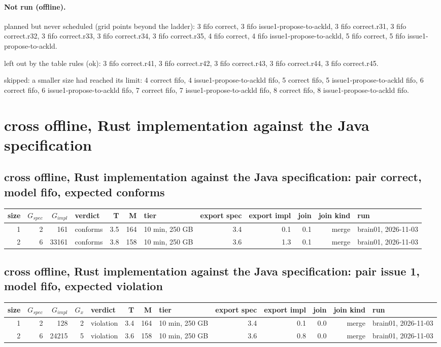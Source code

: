 \documentclass[10pt]{article}
\begin{document}
\paragraph{Not run (offline).}
planned but never scheduled (grid points beyond the ladder): 3 fifo correct, 3 fifo issue1-propose-to-ackld, 3 fifo correct.r31, 3 fifo correct.r32, 3 fifo correct.r33, 3 fifo correct.r34, 3 fifo correct.r35, 4 fifo correct, 4 fifo issue1-propose-to-ackld, 5 fifo correct, 5 fifo issue1-propose-to-ackld.\par
left out by the table rules (ok): 3 fifo correct.r41, 3 fifo correct.r42, 3 fifo correct.r43, 3 fifo correct.r44, 3 fifo correct.r45.\par
skipped: a smaller size had reached its limit: 4 correct fifo, 4 issue1-propose-to-ackld fifo, 5 correct fifo, 5 issue1-propose-to-ackld fifo, 6 correct fifo, 6 issue1-propose-to-ackld fifo, 7 correct fifo, 7 issue1-propose-to-ackld fifo, 8 correct fifo, 8 issue1-propose-to-ackld fifo.\par
\section*{cross offline, Rust implementation against the Java specification}
\subsection*{cross offline, Rust implementation against the Java specification: pair \textsf{correct}, model fifo, expected conforms}
\begin{longtable}{@{}rrrlrrlrrrrl@{}}
\toprule
size & $G_{\mathit{spec}}$ & $G_{\mathit{impl}}$ & verdict & T & M & tier & export spec & export impl & join & join kind & run \\
\midrule
\endhead
\color{blue} 1 & 2 & 161 & conforms & 3.5 & 164 & 10 min, 250 GB & 3.4 & 0.1 & 0.1 & merge & brain01, 2026-11-03 \\
\color{blue} 2 & 6 & 33161 & conforms & 3.8 & 158 & 10 min, 250 GB & 3.6 & 1.3 & 0.1 & merge & brain01, 2026-11-03 \\
\bottomrule
\end{longtable}
\subsection*{cross offline, Rust implementation against the Java specification: pair \textsf{issue 1}, model fifo, expected violation}
\begin{longtable}{@{}rrrrlrrlrrrrl@{}}
\toprule
size & $G_{\mathit{spec}}$ & $G_{\mathit{impl}}$ & $G_x$ & verdict & T & M & tier & export spec & export impl & join & join kind & run \\
\midrule
\endhead
\color{blue} 1 & 2 & 128 & 2 & violation & 3.4 & 164 & 10 min, 250 GB & 3.4 & 0.1 & 0.0 & merge & brain01, 2026-11-03 \\
\color{blue} 2 & 6 & 24215 & 5 & violation & 3.6 & 158 & 10 min, 250 GB & 3.6 & 0.8 & 0.0 & merge & brain01, 2026-11-03 \\
\bottomrule
\end{longtable}
\end{document}
